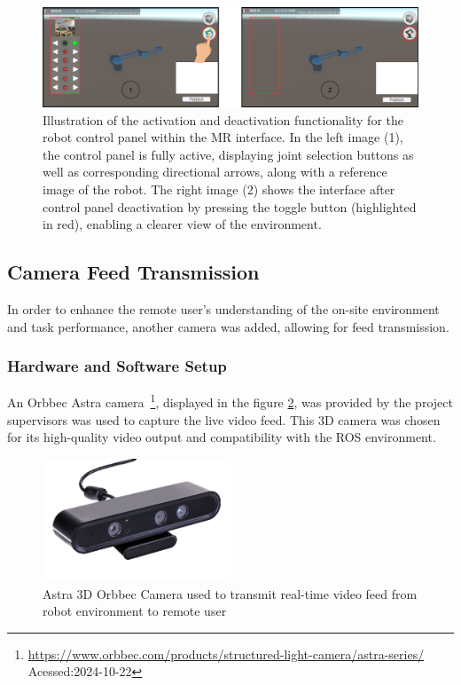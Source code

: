 \begin{figure}[h]
    \centering
    \includegraphics[width=\linewidth]{figs/mao-toca-ui-refeita-numbers.png}
    \caption{Illustration of the activation and deactivation functionality for the robot control panel within the \ac{MR} interface. In the left image (1), the control panel is fully active, displaying joint selection buttons as well as corresponding directional arrows, along with a reference image of the robot. The right image (2) shows the interface after control panel deactivation by pressing the toggle button (highlighted in red), enabling a clearer view of the environment.}
    \label{fig:menu-toggle-button}
\end{figure}


\subsection{Camera Feed Transmission}

In order to enhance the remote user's understanding of the on-site environment and task performance, another camera was added, allowing for feed transmission. 

\subsubsection{Hardware and Software Setup}
An Orbbec Astra camera~\footnote{\url{https://www.orbbec.com/products/structured-light-camera/astra-series/} Acessed:2024-10-22}, displayed in the figure \ref{fig:astra-camera}, was provided by the project supervisors was used to capture the live video feed. This 3D camera was chosen for its high-quality video output and compatibility with the \ac{ROS} environment.

\begin{figure}[h]
    \centering
    \includegraphics[width=0.5\textwidth]{figs/AstraSeries_3.jpg}
    \caption{Astra 3D Orbbec Camera used to transmit real-time video feed from robot environment to remote user}
    \label{fig:astra-camera}
\end{figure}
\FloatBarrier

